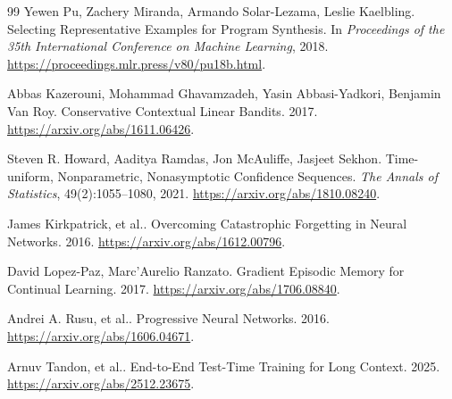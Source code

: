\begin{thebibliography}{99}
Yewen Pu, Zachery Miranda, Armando Solar-Lezama, Leslie Kaelbling.
Selecting Representative Examples for Program Synthesis.
In \emph{Proceedings of the 35th International Conference on Machine Learning}, 2018.
\url{https://proceedings.mlr.press/v80/pu18b.html}.

Abbas Kazerouni, Mohammad Ghavamzadeh, Yasin Abbasi-Yadkori, Benjamin Van Roy.
Conservative Contextual Linear Bandits.
2017.
\url{https://arxiv.org/abs/1611.06426}.

Steven R. Howard, Aaditya Ramdas, Jon McAuliffe, Jasjeet Sekhon.
Time-uniform, Nonparametric, Nonasymptotic Confidence Sequences.
\emph{The Annals of Statistics}, 49(2):1055--1080, 2021.
\url{https://arxiv.org/abs/1810.08240}.

James Kirkpatrick, et al..
Overcoming Catastrophic Forgetting in Neural Networks.
2016.
\url{https://arxiv.org/abs/1612.00796}.

David Lopez-Paz, Marc'Aurelio Ranzato.
Gradient Episodic Memory for Continual Learning.
2017.
\url{https://arxiv.org/abs/1706.08840}.

Andrei A. Rusu, et al..
Progressive Neural Networks.
2016.
\url{https://arxiv.org/abs/1606.04671}.

Arnuv Tandon, et al..
End-to-End Test-Time Training for Long Context.
2025.
\url{https://arxiv.org/abs/2512.23675}.

\end{thebibliography}
